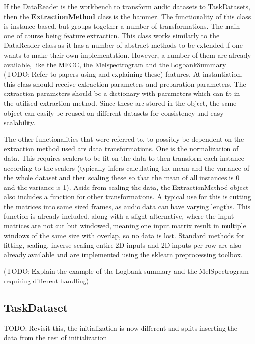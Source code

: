 If the DataReader is the workbench to transform audio datasets to TaskDatasets, then the \textbf{ExtractionMethod} class is the hammer. The functionality of this class is instance based, but groups together a number of transformations. The main one of course being feature extraction. This class works similarly to the DataReader class as it has a number of abstract methods to be extended if one wants to make their own implementation. However, a number of them are already available, like the MFCC, the Melspectrogram and the LogbankSummary (TODO: Refer to papers using and explaining these) features. At instantiation, this class should receive extraction parameters and preparation parameters. The extraction parameters should be a dictionary with parameters which can fit in the utilised extraction method. Since these are stored in the object, the same object can easily be reused on different datasets for consistency and easy scalability. 

The other functionalities that were referred to, to possibly be dependent on the extraction method used are data transformations. One is the normalization of data. This requires scalers to be fit on the data to then transform each instance according to the scalers (typically infers calculating the mean and the variance of the whole dataset and then scaling these so that the mean of all instances is 0 and the variance is 1). Aside from scaling the data, the ExtractionMethod object also includes a function for other transformations. A typical use for this is cutting the matrices into same sized frames, as audio data can have varying lengths. This function is already included, along with a slight alternative, where the input matrices are not cut but windowed, meaning one input matrix result in multiple windows of the same size with overlap, so no data is lost. Standard methods for fitting, scaling, inverse scaling entire 2D inputs and 2D inputs per row are also already available and are implemented using the sklearn preprocessing toolbox.

(TODO: Explain the example of the Logbank summary and the MelSpectrogram requiring different handling)

\subsection{TaskDataset} \label{Impl:DataRead:TaskDataset}

TODO: Revisit this, the initialization is now different and splits inserting the data from the rest of initialization

